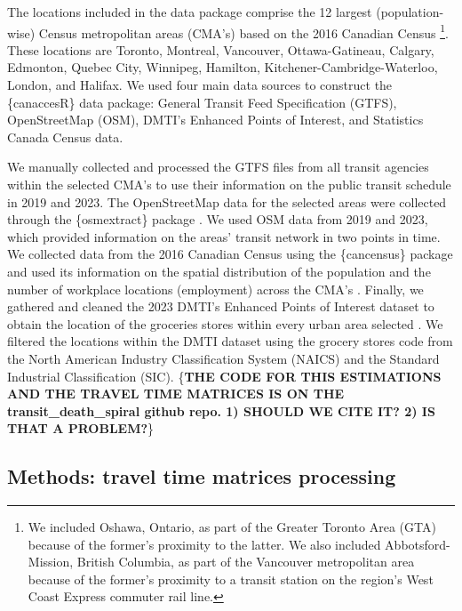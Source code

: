 \documentclass[Royal,times,sageh]{sagej}
\begin{document}
The locations included in the data package comprise the 12 largest
(population-wise) Census metropolitan areas (CMA's) based on the 2016
Canadian Census \citep{governmentofcanada2016CensusPopulation2016}
\footnote{We included Oshawa, Ontario, as part of the Greater Toronto
  Area (GTA) because of the former's proximity to the latter. We also
  included Abbotsford-Mission, British Columbia, as part of the
  Vancouver metropolitan area because of the former's proximity to a
  transit station on the region's West Coast Express commuter rail line.}.
These locations are Toronto, Montreal, Vancouver, Ottawa-Gatineau,
Calgary, Edmonton, Quebec City, Winnipeg, Hamilton,
Kitchener-Cambridge-Waterloo, London, and Halifax. We used four main
data sources to construct the \{canaccesR\} data package: General
Transit Feed Specification (GTFS), OpenStreetMap (OSM), DMTI's Enhanced
Points of Interest, and Statistics Canada Census data.

We manually collected and processed the GTFS files from all transit
agencies within the selected CMA's to use their information on the
public transit schedule in 2019 and 2023. The OpenStreetMap data for the
selected areas were collected through the \{osmextract\} package
\citep{gilardiOsmextractDownloadImport2025}. We used OSM data from 2019
and 2023, which provided information on the areas' transit network in
two points in time. We collected data from the 2016 Canadian Census
using the \{cancensus\} package
\citep{vonbergmannCancensusPackageAccess2022} and used its information
on the spatial distribution of the population and the number of
workplace locations (employment) across the CMA's
\citep{governmentofcanada2016CensusPopulation2016}. Finally, we gathered
and cleaned the 2023 DMTI's Enhanced Points of Interest dataset to
obtain the location of the groceries stores within every urban area
selected \citep{dmtispatialincEnhancedPointsInterest2015}. We filtered
the locations within the DMTI dataset using the grocery stores code from
the North American Industry Classification System (NAICS) and the
Standard Industrial Classification (SIC). \{\textbf{THE CODE FOR THIS
ESTIMATIONS AND THE TRAVEL TIME MATRICES IS ON THE
transit\_death\_spiral github repo. 1) SHOULD WE CITE IT? 2) IS THAT A
PROBLEM?}\}

\subsection{Methods: travel time matrices
processing}\label{methods-travel-time-matrices-processing}
\end{document}
